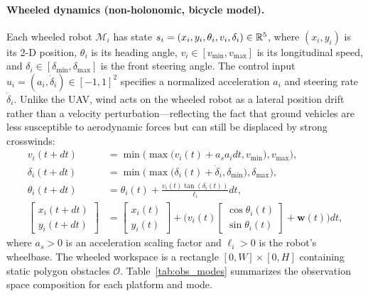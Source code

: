 \documentclass{article}
\providecommand{\obst}{\mathcal{O}}
\begin{document}
\paragraph{Wheeled dynamics (non-holonomic, bicycle model).}
Each wheeled robot $\mathcal{M}_i$ has state $s_i = (x_i, y_i, \theta_i, v_i, \delta_i) \in \mathbb{R}^5$, where $(x_i, y_i)$ is its 2-D position, $\theta_i$ is its heading angle, $v_i \in [v_{\min}, v_{\max}]$ is its longitudinal speed, and $\delta_i \in [\delta_{\min}, \delta_{\max}]$ is the front steering angle. The control input $u_i = (a_i, \dot{\delta}_i) \in [-1,1]^2$ specifies a normalized acceleration $a_i$ and steering rate $\dot{\delta}_i$. Unlike the UAV, wind acts on the wheeled robot as a lateral position drift rather than a velocity perturbation---reflecting the fact that ground vehicles are less susceptible to aerodynamic forces but can still be displaced by strong crosswinds:
\begin{align}
    v_i(t+dt) &= \min \big( \max \big( v_i(t) + a_s a_i dt,  v_{\min} \big),  v_{\max}\big), \label{eq:whl_vel} \\
    \delta_i(t+dt) &= \min \big( \max \big( \delta_i(t) + \dot{\delta}_i,  \delta_{\min} \big),  \delta_{\max}\big), \label{eq:whl_steer} \\
    \theta_i(t+dt) &= \theta_i(t) + \tfrac{v_i(t) \tan(\delta_i(t))}{\ell_i} dt, \label{eq:whl_head} \\
    \begin{bmatrix} x_i(t+dt) \\ y_i(t+dt) \end{bmatrix} &=
    \begin{bmatrix} x_i(t) \\ y_i(t) \end{bmatrix}
    + \Big( v_i(t) \begin{bmatrix}\cos\theta_i(t)\\\sin\theta_i(t)\end{bmatrix} + \mathbf{w}(t) \Big) dt, \label{eq:whl_pos}
\end{align}
where $a_s > 0$ is an acceleration scaling factor and $\ell_i > 0$ is the robot's wheelbase. The wheeled workspace is a rectangle $[0, W]\times[0, H]$ containing static polygon obstacles $\obst$. Table~\ref{tab:obs_modes} summarizes the observation space composition for each platform and mode.
\end{document}
